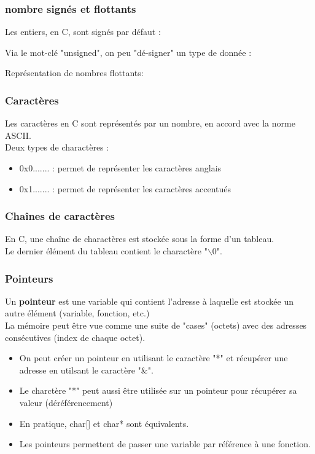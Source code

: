 \documentclass{article}
\newcommand{\insertslide}[2]{
\begin{center}
    \fbox{\texttt{[image: \#1]}}
\end{center}
}
\begin{document}
        \subsubsection{nombre signés et flottants}
            Les entiers, en C, sont signés par défaut :
            \insertslide{Slides/CM2.pdf}{22}
            Via le mot-clé "unsigned", on peu "dé-signer" un type de donnée :
            \insertslide{Slides/CM2.pdf}{21}
            Représentation de nombres flottants:
            \insertslide{Slides/CM2.pdf}{23}
        
        \subsubsection{Caractères}
            Les caractères en C sont représentés par un nombre, en accord avec la
            norme ASCII.\\
            Deux types de charactères :
            \begin{itemize}
                \item 0x0....... : permet de représenter les caractères anglais
                \item 0x1....... : permet de représenter les caractères accentués
            \end{itemize}
            \insertslide{Slides/CM2.pdf}{26}
        
        \subsubsection{Chaînes de caractères}
            En C, une chaîne de charactères est stockée sous la forme d'un tableau.\\
            Le dernier élément du tableau contient le charactère "$\backslash$0".
        
        \subsubsection{Pointeurs}
            Un \textbf{pointeur} est une variable qui contient l’adresse à
            laquelle est stockée un autre élément (variable, fonction, etc.)\\
            La mémoire peut être vue comme une suite de "cases" (octets) avec des 
            adresses consécutives (index de chaque octet).
            \begin{itemize}
                \item On peut créer un pointeur en utilisant le caractère "*" et récupérer
                une adresse en utilsant le caractère "\&".
                \item Le charctère "*" peut aussi être utilisée sur un pointeur pour récupérer sa valeur (déréférencement)
                \item En pratique, char[] et char* sont équivalents.
                \item Les pointeurs permettent de passer une variable par référence à une fonction.
            \end{itemize}
        
\end{document}
